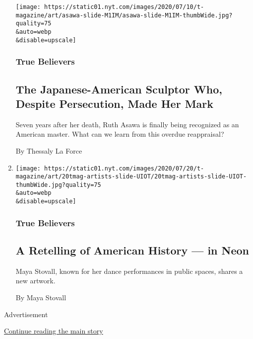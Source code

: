 \begin{enumerate}
  \texttt{[image: https://static01.nyt.com/images/2020/07/10/t-magazine/art/asawa-slide-M1IM/asawa-slide-M1IM-thumbWide.jpg?quality=75\\\&auto=webp\\\&disable=upscale]}

  \hypertarget{true-believers-15}{%
  \subsubsection{True Believers}\label{true-believers-15}}

  \hypertarget{the-japanese-american-sculptor-who-despite-persecution-made-her-mark-1}{%
  \subsection{The Japanese-American Sculptor Who, Despite Persecution,
  Made Her
  Mark}\label{the-japanese-american-sculptor-who-despite-persecution-made-her-mark-1}}

  Seven years after her death, Ruth Asawa is finally being recognized as
  an American master. What can we learn from this overdue reappraisal?

  By Thessaly La Force
\item
  \href{/2020/07/20/t-magazine/maya-stovall.html}{}

  \texttt{[image: https://static01.nyt.com/images/2020/07/20/t-magazine/art/20tmag-artists-slide-UIOT/20tmag-artists-slide-UIOT-thumbWide.jpg?quality=75\\\&auto=webp\\\&disable=upscale]}

  \hypertarget{true-believers-16}{%
  \subsubsection{True Believers}\label{true-believers-16}}

  \hypertarget{a-retelling-of-american-history--in-neon-1}{%
  \subsection{A Retelling of American History --- in
  Neon}\label{a-retelling-of-american-history--in-neon-1}}

  Maya Stovall, known for her dance performances in public spaces,
  shares a new artwork.

  By Maya Stovall
\end{enumerate}

Advertisement

\protect\hyperlink{after-mid2}{Continue reading the main story}

